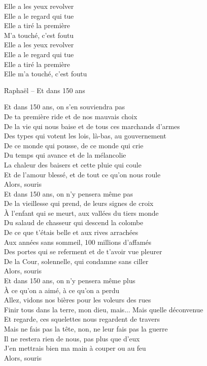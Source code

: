 \documentclass{novel}
\begin{document}
\begin{multicols}{2}
Elle a les yeux revolver \\
Elle a le regard qui tue \\
Elle a tiré la première \\
M'a touché, c'est foutu \\

Elle a les yeux revolver \\
Elle a le regard qui tue \\
Elle a tiré la première \\
Elle m'a touché, c'est foutu
\end{multicols}


\newpage
\normalsize
\h*{Raphaël – Et dans 150 ans}

\begin{multicols}{2}
Et dans 150 ans, on s'en souviendra pas \\
De ta première ride et de nos mauvais choix \\
De la vie qui nous baise et de tous ces marchands d'armes \\
Des types qui votent les lois, là-bas, au gouvernement \\
De ce monde qui pousse, de ce monde qui crie \\
Du temps qui avance et de la mélancolie \\
La chaleur des baisers et cette pluie qui coule \\
Et de l'amour blessé, et de tout ce qu'on nous roule \\
Alors, souris \\

Et dans 150 ans, on n'y pensera même pas \\
De la vieillesse qui prend, de leurs signes de croix \\
À l'enfant qui se meurt, aux vallées du tiers monde \\
Du salaud de chasseur qui descend la colombe \\
De ce que t'étais belle et aux rives arrachées \\
Aux années sans sommeil, 100 millions d'affamés \\
Des portes qui se referment et de t'avoir vue pleurer \\
De la Cour, solennelle, qui condamne sans ciller \\
Alors, souris \\

Et dans 150 ans, on n'y pensera même plus \\
À ce qu'on a aimé, à ce qu'on a perdu \\
Allez, vidons nos bières pour les voleurs des rues \\
Finir tous dans la terre, mon dieu, mais... Mais quelle déconvenue \\
Et regarde, ces squelettes nous regardent de travers \\
Mais ne fais pas la tête, non, ne leur fais pas la guerre \\
Il ne restera rien de nous, pas plus que d'eux \\
J'en mettrais bien ma main à couper ou au feu \\
Alors, souris \\


\end{multicols}
\end{document}
